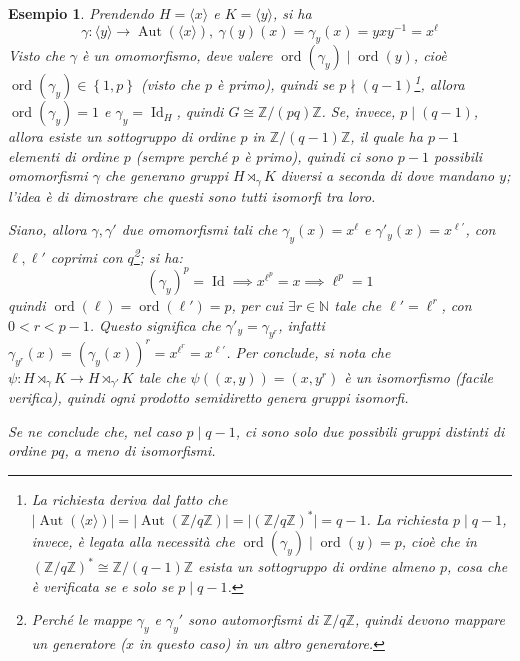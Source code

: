 \documentclass[11pt]{scrartcl}
\theoremstyle{style1}
\newtheorem{esempio}{Esempio}[section]
\numberwithin{equation}{subsection}
\begin{document}
\begin{esempio}
	Prendendo $H = \langle x \rangle$ e $ K = \langle y \rangle$, si ha
	\[
	\gamma : \langle y \rangle \longrightarrow \operatorname{Aut} (\langle x \rangle),  \ \gamma(y)(x) = \gamma_y(x) = yxy^{-1}= x^\ell 
	\] 
	Visto che $\gamma$ \`e un omomorfismo, deve valere $\operatorname{ord}(\gamma_y)  \mid \operatorname{ord}(y) $, cio\`e $\operatorname{ord}(\gamma_y) \in \left\{ 1,p \right\} $ (visto che $p$ \`e primo), quindi se $p  \nmid  (q - 1)$\footnote{La richiesta deriva dal fatto che $\lvert \operatorname{Aut} (\langle x \rangle) \rvert = \lvert \operatorname{Aut} (\mathbb{Z}/q\mathbb{Z}) \rvert =\lvert (\mathbb{Z}/q\mathbb{Z})^* \rvert = q - 1$. La richiesta $p  \mid q-1$, invece, \`e legata alla necessit\`a che $\operatorname{ord}(\gamma_y)  \mid \operatorname{ord}(y) =p$, cio\`e che in $(\mathbb{Z}/q\mathbb{Z})^*\cong \mathbb{Z}/(q-1)\mathbb{Z}$ esista un sottogruppo di ordine almeno $p$, cosa che \`e verificata se e solo se $p  \mid q-1$.}, allora $\operatorname{ord}(\gamma_y) =1$ e $\gamma_y = \operatorname{Id} _H$, quindi $G \cong \mathbb{Z}/(pq) \mathbb{Z}$.
	Se, invece, $p \mid (q-1)$, allora esiste un sottogruppo di ordine $p$ in $\mathbb{Z}/(q-1)\mathbb{Z}$, il quale ha $p-1$ elementi di ordine $p$ (sempre perch\'e $p$ \`e primo), quindi ci sono $p-1$ possibili omomorfismi $\gamma$ che generano gruppi $H \rtimes _\gamma K$ diversi a seconda di dove mandano $y$; l'idea \`e di dimostrare che questi sono tutti isomorfi tra loro.

	Siano, allora $\gamma, \gamma'$ due omomorfismi tali che $\gamma_y(x) = x^\ell $ e $\gamma'_y(x) = x^{\ell '} $, con $\ell ,\ell '$ coprimi con $q$\footnote{Perch\'e le mappe $\gamma_y$ e $\gamma_y'$ sono automorfismi di $\mathbb{Z} / q\mathbb{Z}$, quindi devono mappare un generatore ($x$ in questo caso) in un altro generatore.}; si ha:
	\[
		(\gamma_y)^p = \operatorname{Id} \implies x^{\ell ^p} =x\implies \ell ^p = 1
	\] 
	quindi $\operatorname{ord}(\ell ) = \operatorname{ord}(\ell ') =p$, per cui $\exists r \in \mathbb{N}$ tale che $\ell ' = \ell ^r $, con $0 < r < p-1$.
	Questo significa che $\gamma'_y = \gamma_{y^r} $, infatti $\gamma_{y^r} (x) =( \gamma_y(x))^r = x^{\ell ^r} = x^{\ell '} $.
Per conclude, si nota che $\psi : H \rtimes _\gamma K\longrightarrow H \rtimes _{\gamma'} K$ tale che $\psi ((x,y)) = (x,y^r)$ \`e un isomorfismo (facile verifica), quindi ogni prodotto semidiretto genera gruppi isomorfi.

Se ne conclude che, nel caso $p  \mid  q-1$, ci sono solo due possibili gruppi distinti di ordine $pq$, a meno di isomorfismi.
\end{esempio}
\end{document}
